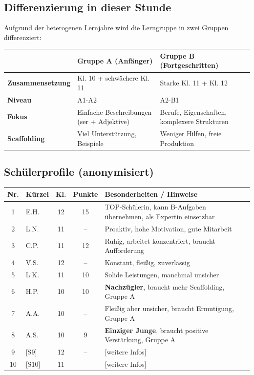 \documentclass[11pt, a4paper]{article}
\begin{document}
\subsection{Differenzierung in dieser Stunde}

Aufgrund der heterogenen Lernjahre wird die Lerngruppe in zwei Gruppen differenziert:

\begin{center}
\begin{tabular}{|l|p{5cm}|p{5cm}|}
    \hline
    & \textbf{Gruppe A (Anfänger)} & \textbf{Gruppe B (Fortgeschritten)} \\
    \hline
    \textbf{Zusammensetzung} & Kl. 10 + schwächere Kl. 11 & Starke Kl. 11 + Kl. 12 \\
    \hline
    \textbf{Niveau} & A1-A2 & A2-B1 \\
    \hline
    \textbf{Fokus} & Einfache Beschreibungen (ser + Adjektive) & Berufe, Eigenschaften, komplexere Strukturen \\
    \hline
    \textbf{Scaffolding} & Viel Unterstützung, Beispiele & Weniger Hilfen, freie Produktion \\
    \hline
\end{tabular}
\end{center}

\subsection{Schülerprofile (anonymisiert)}

\begin{center}
\small
\begin{tabular}{|c|l|c|c|p{5.5cm}|}
    \hline
    \textbf{Nr.} & \textbf{Kürzel} & \textbf{Kl.} & \textbf{Punkte} & \textbf{Besonderheiten / Hinweise} \\
    \hline
    1 & E.H. & 12 & 15 & TOP-Schülerin, kann B-Aufgaben übernehmen, als Expertin einsetzbar \\
    \hline
    2 & L.N. & 11 & -- & Proaktiv, hohe Motivation, gute Mitarbeit \\
    \hline
    3 & C.P. & 11 & 12 & Ruhig, arbeitet konzentriert, braucht Aufforderung \\
    \hline
    4 & V.S. & 12 & -- & Konstant, fleißig, zuverlässig \\
    \hline
    5 & L.K. & 11 & 10 & Solide Leistungen, manchmal unsicher \\
    \hline
    6 & H.P. & 10 & 10 & \textbf{Nachzügler}, braucht mehr Scaffolding, Gruppe A \\
    \hline
    7 & A.A. & 10 & -- & Fleißig aber unsicher, braucht Ermutigung, Gruppe A \\
    \hline
    8 & A.S. & 10 & 9 & \textbf{Einziger Junge}, braucht positive Verstärkung, Gruppe A \\
    \hline
    9 & [S9] & 12 & -- & [weitere Infos] \\
    \hline
    10 & [S10] & 11 & -- & [weitere Infos] \\
    \hline
\end{tabular}
\end{center}
\end{document}
